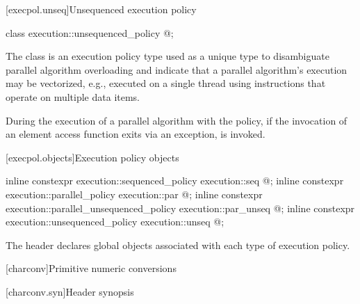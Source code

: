 [execpol.unseq]{Unsequenced execution policy}

%
\begin{itemdecl}
class execution::unsequenced_policy { @\unspec@ };
\end{itemdecl}

\pnum
The class  is an execution policy type
used as a unique type to disambiguate parallel algorithm overloading and
indicate that a parallel algorithm's execution may be vectorized,
e.g., executed on a single thread using instructions
that operate on multiple data items.

\pnum
During the execution of a parallel algorithm with
the  policy,
if the invocation of an element access function exits via an exception,
 is invoked.

[execpol.objects]{Execution policy objects}

%
%
%
%
%
%
\begin{itemdecl}
inline constexpr execution::sequenced_policy            execution::seq{ @\unspec@ };
inline constexpr execution::parallel_policy             execution::par{ @\unspec@ };
inline constexpr execution::parallel_unsequenced_policy execution::par_unseq{ @\unspec@ };
inline constexpr execution::unsequenced_policy          execution::unseq{ @\unspec@ };
\end{itemdecl}

\begin{itemdescr}
\pnum
The header  declares global objects associated with each type of execution policy.
\end{itemdescr}

[charconv]{Primitive numeric conversions}

[charconv.syn]{Header  synopsis}

